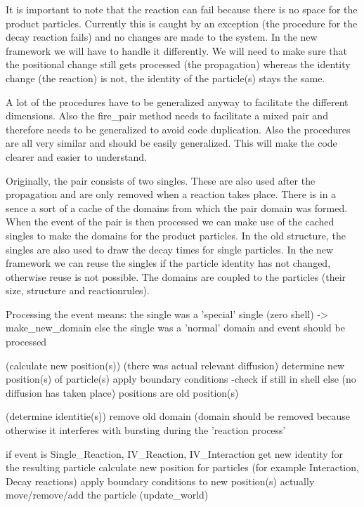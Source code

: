 \documentclass[a4paper, 11pt]{article}
\begin{document}
It is important to note that the reaction can fail because there is no space for the product particles. Currently this is caught
by an exception (the procedure for the decay reaction fails) and no changes are made to the system. In the new framework we will
have to handle it differently. We will need to make sure that the positional change still gets processed (the propagation) whereas
the identity change (the reaction) is not, the identity of the particle(s) stays the same.

A lot of the procedures have to be generalized anyway to facilitate the different dimensions. Also the fire\_pair method needs to
facilitate a mixed pair and therefore needs to be generalized to avoid code duplication.
Also the procedures are all very similar and should be easily generalized. This will make the code clearer and easier to understand.

Originally, the pair consists of two singles. These are also used after the propagation and are only removed when a reaction takes
place. There is in a sence a sort of a cache of the domains from which the pair domain was formed. When the event of the pair is then
processed we can make use of the cached singles to make the domains for the product particles. In the old structure, the singles
are also used to draw the decay times for single particles.
In the new framework we can reuse the singles if the particle identity has not changed, otherwise reuse is not possible. The domains
are coupled to the particles (their size, structure and reactionrules).



Processing the event means:
  the single was a 'special' single (zero shell) -> make\_new\_domain
else
  the single was a 'normal' domain and event should be processed

  (calculate new position(s))
    (there was actual relevant diffusion)
    determine new position(s) of particle(s)
    apply boundary conditions
    -check if still in shell
  else
    (no diffusion has taken place)
    positions are old position(s)


  (determine identitie(s))
  remove old domain (domain should be removed because otherwise it interferes with
  bursting during the 'reaction process'

  if event is Single\_Reaction, IV\_Reaction, IV\_Interaction
    get new identity for the resulting particle
    calculate new position for particles (for example Interaction, Decay reactions)
    apply boundary conditions to new position(s)
    actually move/remove/add the particle (update\_world)
\end{document}
